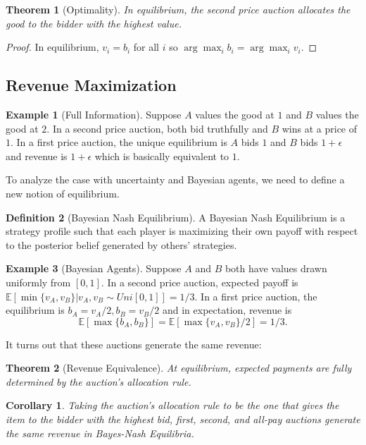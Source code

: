 \documentclass[dvipsnames]{article}
\newcommand{\E}[1]{\mathbb{E}\left[#1\right]}
\newtheorem{theorem}{Theorem}[section]
\newtheorem{corollary}{Corollary}[theorem]
\theoremstyle{definition}
\newtheorem{definition}{Definition}[section]
\newtheorem{example}[definition]{Example}
\theoremstyle{remark}
\begin{document}
\begin{theorem}[Optimality]
	In equilibrium, the second price auction allocates the good to the bidder with the highest value.
\end{theorem}

\begin{proof}
	In equilibrium, $v_i = b_i$ for all $i$ so $\arg\max_i b_i = \arg\max_i v_i$.
\end{proof}

\subsection{Revenue Maximization}
\begin{example}[Full Information]
	Suppose $A$ values the good at $1$ and $B$ values the good at $2$. In a second price auction, both bid truthfully and $B$ wins at a price of $1$. In a first price auction, the unique equilibrium is $A$ bids $1$ and $B$ bids $1 + \epsilon$ and revenue is $1+\epsilon$ which is basically equivalent to $1$.
\end{example}

To analyze the case with uncertainty and Bayesian agents, we need to define a new notion of equilibrium.

\begin{definition}[Bayesian Nash Equilibrium]
	A Bayesian Nash Equilibrium is a strategy profile such that each player is maximizing their own payoff with respect to the posterior belief generated by others' strategies.
\end{definition}

\begin{example}[Bayesian Agents]
	Suppose $A$ and $B$ both have values drawn uniformly from $[0,1]$. In a second price auction, expected payoff is $\mathbb{E}\left[\min\{v_A,v_B\}|v_A,v_B \sim Uni[0,1]\right] = 1/3.$ In a first price auction, the equilibrium is $b_A = v_A/2, b_B = v_B/2$ and in expectation, revenue is
	$$\E{\max\{b_A,b_B\}} = \E{\max\{v_A,v_B\}/2} = 1/3.$$
\end{example}

It turns out that these auctions generate the same revenue:

\begin{theorem}[Revenue Equivalence]
	At equilibrium, expected payments are fully determined by the auction's allocation rule.
\end{theorem}

\begin{corollary}
	Taking the auction's allocation rule to be the one that gives the item to the bidder with the highest bid, first, second, and all-pay auctions generate the same revenue in Bayes-Nash Equilibria.
\end{corollary}
\end{document}
